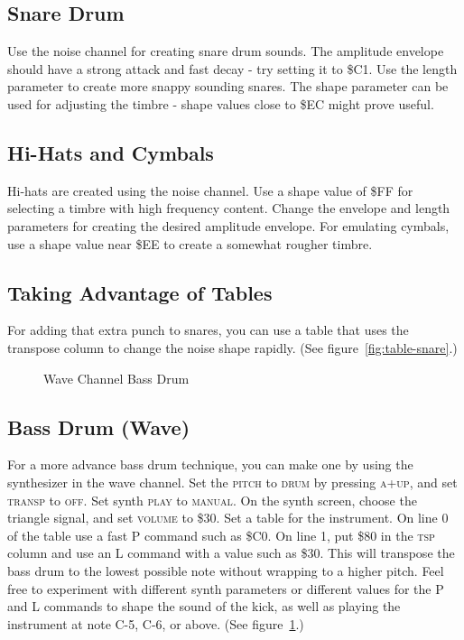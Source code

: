 \subsection{Snare Drum}

Use the noise channel for creating snare drum sounds. The amplitude envelope should have a strong attack and fast decay - try setting it to \$C1. Use the length parameter to create more snappy sounding snares. The shape parameter can be used for adjusting the timbre - shape values close to \$EC might prove useful.

\subsection{Hi-Hats and Cymbals}

Hi-hats are created using the noise channel. Use a shape value of \$FF for selecting a timbre with high frequency content. Change the envelope and length parameters for creating the desired amplitude envelope. For emulating cymbals, use a shape value near \$EE to create a somewhat rougher timbre.

\subsection{Taking Advantage of Tables}

For adding that extra punch to snares, you can use a table that uses the transpose column to change the noise shape rapidly. (See figure~\ref{fig:table-snare}.)

\begin{figure}[hbtp]
	\centering
	\qquad

	\qquad

	\caption{Wave Channel Bass Drum}
	\label{fig:wavekick}
\end{figure}

\subsection{Bass Drum (Wave)}

For a more advance bass drum technique, you can make one by using the synthesizer in the wave channel. Set the \textsc{pitch} to \textsc{drum} by pressing \textsc{a+up}, and set \textsc{transp} to \textsc{off}. Set synth \textsc{play} to \textsc{manual}. On the synth screen, choose the triangle signal, and set \textsc{volume} to \$30. Set a table for the instrument. On line 0 of the table use a fast P command such as \$C0. On line 1, put \$80 in the \textsc{tsp} column and use an L command with a value such as \$30. This will transpose the bass drum to the lowest possible note without wrapping to a higher pitch.  Feel free to experiment with different synth parameters or different values for the P and L commands to shape the sound of the kick, as well as playing the instrument at note C-5, C-6, or above. (See figure~\ref{fig:wavekick}.)
